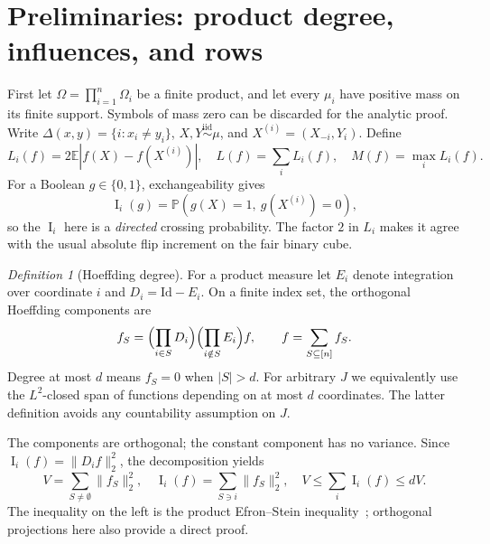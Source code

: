 \documentclass[11pt]{article}
\numberwithin{equation}{section}
\theoremstyle{remark}
\newtheorem{definition}[theorem]{Definition}
\newcommand{\E}{\mathbb E}
\newcommand{\Prb}{\mathbb P}
\newcommand{\Inf}{\operatorname{I}}
\newcommand{\norm}[1]{\lVert #1\rVert}
\newcommand{\delt}{\Delta}
\begin{document}
\section{Preliminaries: product degree, influences, and rows}\label{sec:prelim}
First let $\Omega=\prod_{i=1}^n\Omega_i$ be a finite product, and let every $\mu_i$ have positive mass on its finite support. Symbols of mass zero can be discarded for the analytic proof. Write
$\delt(x,y)=\{i:x_i\ne y_i\}$,
$X,Y\stackrel{\mathrm{iid}}\sim\mu$, and $X^{(i)}=(X_{-i},Y_i)$.
Define
\begin{equation}\label{eq:Li}
 L_i(f)=2\E|f(X)-f(X^{(i)})|,\quad
 L(f)=\sum_iL_i(f),\quad M(f)=\max_iL_i(f).
\end{equation}
For a Boolean $g\in\{0,1\}$, exchangeability gives
\begin{equation}\label{eq:directed}
 \Inf_i(g)=\Prb(g(X)=1,\ g(X^{(i)})=0),
\end{equation}
so the $\Inf_i$ here is a \emph{directed} crossing probability. The factor $2$ in $L_i$ makes it agree with the usual absolute flip increment on the fair binary cube.

\begin{definition}[Hoeffding degree]
For a product measure let $E_i$ denote integration over coordinate $i$ and $D_i=\mathrm{Id}-E_i$. On a finite index set, the orthogonal Hoeffding components are
\begin{equation}\label{eq:hoeff}
 f_S=\Bigl(\prod_{i\in S}D_i\Bigr)
       \Bigl(\prod_{i\notin S}E_i\Bigr)f,
 \qquad f=\sum_{S\subseteq[n]}f_S.
\end{equation}
Degree at most $d$ means $f_S=0$ when $|S|>d$. For arbitrary $J$ we equivalently use the $L^2$-closed span of functions depending on at most $d$ coordinates. The latter definition avoids any countability assumption on $J$.
\end{definition}
The components are orthogonal; the constant component has no variance. Since $\Inf_i(f)=\norm{D_if}_2^2$, the decomposition yields
\begin{equation}\label{eq:ES}
 V=\sum_{S\ne\emptyset}\norm{f_S}_2^2,
 \quad \Inf_i(f)=\sum_{S\ni i}\norm{f_S}_2^2,
 \quad V\le\sum_i\Inf_i(f)\le dV.
\end{equation}
The inequality on the left is the product Efron--Stein inequality~\cite{ES81}; orthogonal projections here also provide a direct proof.
\end{document}
